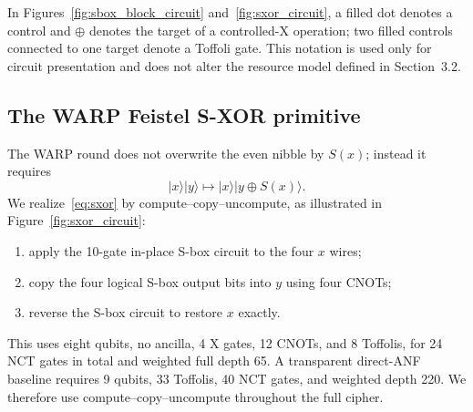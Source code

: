 \documentclass[10pt,a4paper]{article}
\providecommand{\ket}[1]{\lvert #1\rangle}
\begin{document}
In Figures~\ref{fig:sbox_block_circuit} and~\ref{fig:sxor_circuit}, a filled dot denotes a control and $\oplus$ denotes the target of a controlled-X operation; two filled controls connected to one target denote a Toffoli gate. This notation is used only for circuit presentation and does not alter the resource model defined in Section~3.2.

\subsection{The WARP Feistel S-XOR primitive}
The WARP round does not overwrite the even nibble by $S(x)$; instead it requires
\begin{equation}
    \ket{x}\ket{y}\longmapsto \ket{x}\ket{y\oplus S(x)}.
    \label{eq:sxor}
\end{equation}
We realize~\eqref{eq:sxor} by compute--copy--uncompute, as illustrated in Figure~\ref{fig:sxor_circuit}:
\begin{enumerate}
    \item apply the 10-gate in-place S-box circuit to the four $x$ wires;
    \item copy the four logical S-box output bits into $y$ using four CNOTs;
    \item reverse the S-box circuit to restore $x$ exactly.
\end{enumerate}
This uses eight qubits, no ancilla, 4 X gates, 12 CNOTs, and 8 Toffolis, for 24 NCT gates in total and weighted full depth 65. A transparent direct-ANF baseline requires 9 qubits, 33 Toffolis, 40 NCT gates, and weighted depth 220. We therefore use compute--copy--uncompute throughout the full cipher.
\end{document}
